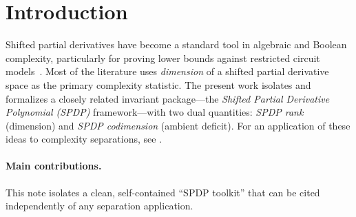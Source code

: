 \documentclass[12pt]{article}
\theoremstyle{definition}
\theoremstyle{remark}
\begin{document}
\tableofcontents
\newpage

\section{Introduction}
Shifted partial derivatives have become a standard tool in algebraic and Boolean
complexity, particularly for proving lower bounds against restricted circuit
models~\citep{NW1997,Kayal2012,GKKS2016,KayalSaha2016,LST2024,SY2010}. Most of the literature uses
\emph{dimension} of a shifted partial derivative space as the primary complexity
statistic. The present work isolates and formalizes a closely related invariant
package---the \emph{Shifted Partial Derivative Polynomial (SPDP)} framework---with
two dual quantities: \emph{SPDP rank} (dimension) and \emph{SPDP codimension}
(ambient deficit). For an application of these ideas to complexity separations,
see \citet{Edwards2025}.

\paragraph{Main contributions.}
This note isolates a clean, self-contained ``SPDP toolkit'' that can be cited
independently of any separation application.
\end{document}
